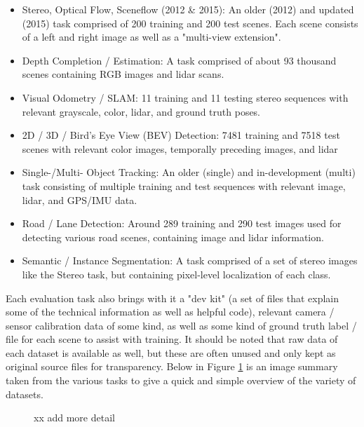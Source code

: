 \begin{itemize}\itemsep=-0.5em 
    \item Stereo, Optical Flow, Sceneflow (2012 \& 2015): An older (2012) and updated (2015) task comprised of 200 training and 200 test scenes. Each scene consists of a left and right image as well as a "multi-view extension".
    \item Depth Completion / Estimation: A task comprised of about 93 thousand scenes containing RGB images and lidar scans.
    \item Visual Odometry / SLAM: 11 training and 11 testing stereo sequences with relevant grayscale, color, lidar, and ground truth poses.
    \item 2D / 3D / Bird's Eye View (BEV) Detection: 7481 training and 7518 test scenes with relevant color images, temporally preceding images, and lidar
    \item Single-/Multi- Object Tracking: An older (single) and in-development (multi) task consisting of multiple training and test sequences with relevant image, lidar, and GPS/IMU data. 
    \item Road / Lane Detection: Around 289 training and 290 test images used for detecting various road scenes, containing image and lidar information.
    \item Semantic / Instance Segmentation: A task comprised of a set of stereo images like the Stereo task, but containing pixel-level localization of each class. 
\end{itemize}

Each evaluation task also brings with it a "dev kit" (a set of files that explain some of the technical information as well as helpful code), relevant camera / sensor calibration data of some kind, as well as some kind of ground truth label / file for each scene to assist with training. It should be noted that raw data of each dataset is available as well, but these are often unused and only kept as original source files for transparency. Below in Figure \ref{kitti_samples} is an image summary taken from the various tasks to give a quick and simple overview of the variety of datasets.

\begin{figure}[H]
    \centering
    \caption{xx add more detail}
    \label{kitti_samples}
\end{figure}


